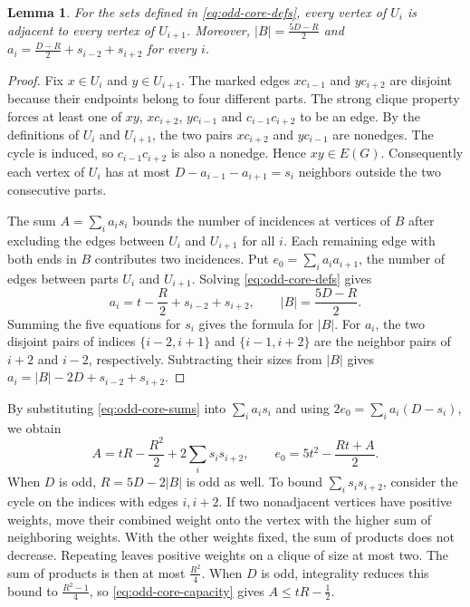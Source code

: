 \documentclass[preprint,11pt,numbers]{elsarticle-arxiv}
\numberwithin{equation}{section}
\newtheorem{lemma}[theorem]{Lemma}
\theoremstyle{definition}
\begin{document}
\begin{lemma}\label{lem:simple-cycle-counts}
For the sets defined in \eqref{eq:odd-core-defs}, every vertex of
$U_i$ is adjacent to every vertex of $U_{i+1}$. Moreover,
$|B|=\frac{5D-R}{2}$ and $a_i=\frac{D-R}{2}+s_{i-2}+s_{i+2}$ for every $i$.
\end{lemma}

\begin{proof}
Fix $x\in U_i$ and $y\in U_{i+1}$. The marked edges
$xc_{i-1}$ and $yc_{i+2}$ are disjoint because their endpoints
belong to four different parts. The strong clique property forces
at least one of $xy$, $xc_{i+2}$, $yc_{i-1}$ and
$c_{i-1}c_{i+2}$ to be an edge. By the definitions of $U_i$
and $U_{i+1}$, the two pairs $xc_{i+2}$ and $yc_{i-1}$ are
nonedges. The cycle is induced, so $c_{i-1}c_{i+2}$ is also
a nonedge. Hence $xy\in E(G)$. Consequently each vertex of $U_i$
has at most $D-a_{i-1}-a_{i+1}=s_i$ neighbors outside the two
consecutive parts.

The sum $A=\sum_i a_i s_i$ bounds the number of incidences at vertices
of $B$ after excluding the edges between $U_i$ and $U_{i+1}$ for all
$i$. Each remaining edge with both ends in $B$ contributes two
incidences. Put $e_0=\sum_i a_i a_{i+1}$, the number of edges between
parts $U_i$ and $U_{i+1}$.
Solving \eqref{eq:odd-core-defs} gives
\begin{equation}\label{eq:odd-core-sums}
 a_i=t-\frac{R}{2}+s_{i-2}+s_{i+2},\qquad
 |B|=\frac{5D-R}{2}.
\end{equation}
Summing the five equations for $s_i$ gives the formula for $|B|$.
For $a_i$, the two disjoint pairs of indices
$\{i-2,i+1\}$ and $\{i-1,i+2\}$ are the neighbor pairs of
$i+2$ and $i-2$, respectively. Subtracting their sizes from $|B|$
gives $a_i=|B|-2D+s_{i-2}+s_{i+2}$.
\end{proof}

By substituting \eqref{eq:odd-core-sums} into $\sum_i a_i s_i$
and using $2e_0=\sum_i a_i(D-s_i)$, we obtain
\begin{equation}\label{eq:odd-core-capacity}
 A=tR-\frac{R^2}{2}+2\sum_i s_i s_{i+2},
 \qquad
 e_0=5t^2-\frac{Rt+A}{2}.
\end{equation}
When $D$ is odd, $R=5D-2|B|$ is odd as well. To bound $\sum_i s_i s_{i+2}$,
consider the cycle on the indices with edges $i,i+2$. If two
nonadjacent vertices have positive weights, move their combined
weight onto the vertex with the higher sum of neighboring weights.
With the other weights fixed, the sum of products does not decrease.
Repeating leaves positive weights on a clique of size at most two.
The sum of products is then at most $\frac{R^2}{4}$. When $D$ is odd, integrality reduces this bound to $\frac{R^2-1}{4}$, so
\eqref{eq:odd-core-capacity} gives $A\leq tR-\frac{1}{2}$.
\end{document}
